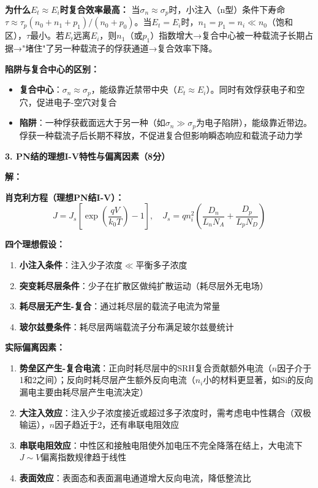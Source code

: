 \documentclass[12pt,a4paper]{ctexart}
\begin{document}
\textbf{为什么$E_t \approx E_i$时复合效率最高：}
当$\sigma_n \approx \sigma_p$时，小注入（n型）条件下寿命$\tau \approx \tau_p(n_0 + n_1 + p_1)/(n_0 + p_0)$。当$E_t = E_i$时，$n_1 = p_1 = n_i \ll n_0$（饱和区），$\tau$最小。若$E_t$远离$E_i$，则$n_1$（或$p_1$）指数增大→复合中心被一种载流子长期占据→"堵住"了另一种载流子的俘获通道→复合效率下降。

\textbf{陷阱与复合中心的区别：}
\begin{itemize}[nosep]
\item \textbf{复合中心}：$\sigma_n \approx \sigma_p$，能级靠近禁带中央（$E_t \approx E_i$）。同时有效俘获电子和空穴，促进电子-空穴对复合
\item \textbf{陷阱}：一种俘获截面远大于另一种（如$\sigma_n \gg \sigma_p$为电子陷阱），能级靠近带边。俘获一种载流子后长期不释放，不促进复合但影响瞬态响应和载流子动力学
\end{itemize}

\noindent\textbf{3. PN结的理想I-V特性与偏离因素（8分）}

\textbf{解：}\quad

\textbf{肖克利方程（理想PN结I-V）：}
\[
J = J_s\left[\exp\left(\frac{qV}{k_0T}\right) - 1\right],\quad
J_s = qn_i^2\left(\frac{D_n}{L_n N_A} + \frac{D_p}{L_p N_D}\right)
\]

\textbf{四个理想假设：}
\begin{enumerate}[nosep]
\item \textbf{小注入条件}：注入少子浓度$\ll$平衡多子浓度
\item \textbf{突变耗尽层条件}：少子在扩散区做纯扩散运动（耗尽层外无电场）
\item \textbf{耗尽层无产生-复合}：通过耗尽层的载流子电流为常量
\item \textbf{玻尔兹曼条件}：耗尽层两端载流子分布满足玻尔兹曼统计
\end{enumerate}

\textbf{实际偏离因素：}
\begin{enumerate}[nosep]
\item \textbf{势垒区产生-复合电流}：正向时耗尽层中的SRH复合贡献额外电流（$n$因子介于1和2之间）；反向时耗尽层产生额外反向电流（$n_i$小的材料更显著，如Si的反向漏电主要由耗尽层产生电流决定）
\item \textbf{大注入效应}：注入少子浓度接近或超过多子浓度时，需考虑电中性耦合（双极输运），$n$因子趋近于2，还有串联电阻效应
\item \textbf{串联电阻效应}：中性区和接触电阻使外加电压不完全降落在结上，大电流下$J \sim V$偏离指数规律趋于线性
\item \textbf{表面效应}：表面态和表面漏电通道增大反向电流，降低整流比
\end{enumerate}
\end{document}

